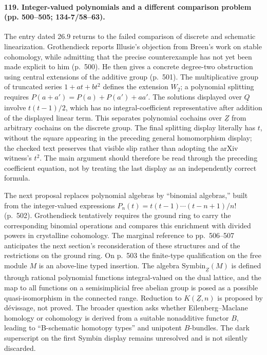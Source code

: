\paragraph{119. Integer-valued polynomials and a different comparison problem (pp. 500--505; 134-7/58--63).}
The entry dated 26.9 returns to the failed comparison of discrete and schematic linearization. Grothendieck reports Illusie's objection from Breen's work on stable cohomology, while admitting that the precise counterexample has not yet been made explicit to him (p.~500). He then gives a concrete degree-two obstruction using central extensions of the additive group (p.~501). The multiplicative group of truncated series $1+at+bt^2$ defines the extension $W_2$; a polynomial splitting requires $P(a+a')=P(a)+P(a')+aa'$. The solutions displayed over $\underline Q$ involve $t(t-1)/2$, which has no integral-coefficient representative after addition of the displayed linear term. This separates polynomial cochains over $\underline Z$ from arbitrary cochains on the discrete group. The final splitting display literally has $t$, without the square appearing in the preceding general homomorphism display; the checked text preserves that visible slip rather than adopting the arXiv witness's $t^2$. The main argument should therefore be read through the preceding coefficient equation, not by treating the last display as an independently correct formula.

The next proposal replaces polynomial algebras by ``binomial algebras,'' built from the integer-valued expressions $P_n(t)=t(t-1)\cdots(t-n+1)/n!$ (p.~502). Grothendieck tentatively requires the ground ring to carry the corresponding binomial operations and compares this enrichment with divided powers in crystalline cohomology. The marginal reference to pp.~506--507 anticipates the next section's reconsideration of these structures and of the restrictions on the ground ring. On p.~503 the finite-type qualification on the free module $M$ is an above-line typed insertion. The algebra $\mathrm{Symbin}_{\underline Z}(M)$ is defined through rational polynomial functions integral-valued on the dual lattice, and the map to all functions on a semisimplicial free abelian group is posed as a possible quasi-isomorphism in the connected range. Reduction to $K(\underline Z,n)$ is proposed by d\'evissage, not proved. The broader question asks whether Eilenberg--Maclane homology or cohomology is derived from a suitable nonadditive functor $B$, leading to ``B-schematic homotopy types'' and unipotent $B$-bundles. The dark superscript on the first Symbin display remains unresolved and is not silently discarded.


